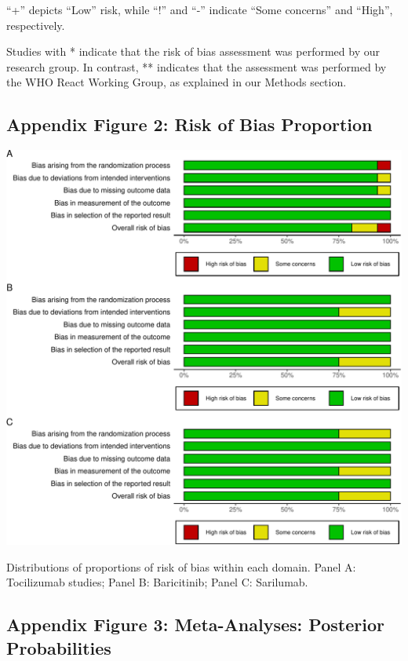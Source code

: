 \documentclass[
  12pt,
]{article}
\begin{document}
``+'' depicts ``Low'' risk, while ``!'' and ``-'' indicate ``Some
concerns'' and ``High'', respectively.

Studies with * indicate that the risk of bias assessment was performed
by our research group. In contrast, ** indicates that the assessment was
performed by the WHO React Working Group, as explained in our Methods
section.

\hypertarget{appendix-figure-2-risk-of-bias-proportion}{%
\subsection{Appendix Figure 2: Risk of Bias
Proportion}\label{appendix-figure-2-risk-of-bias-proportion}}

\begin{center}\includegraphics{supplementary_material_files/figure-latex/unnamed-chunk-8-1} \end{center}

Distributions of proportions of risk of bias within each domain. Panel
A: Tocilizumab studies; Panel B: Baricitinib; Panel C: Sarilumab.

\newpage

\hypertarget{appendix-figure-3-meta-analyses-posterior-probabilities}{%
\subsection{Appendix Figure 3: Meta-Analyses: Posterior
Probabilities}\label{appendix-figure-3-meta-analyses-posterior-probabilities}}
\end{document}
